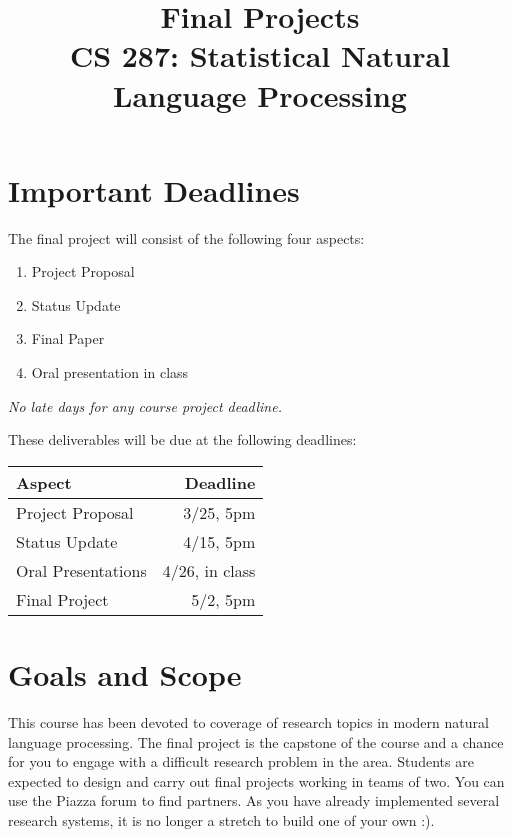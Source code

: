 \documentclass[11pt]{article}
\title{Final Projects  \\ CS 287: Statistical Natural Language Processing}
\date{}
\begin{document}
\maketitle{}

\section{Important Deadlines}

The final project will consist of the following four aspects:

\begin{enumerate}
\item Project Proposal
\item Status Update
\item Final Paper
\item Oral presentation in class
\end{enumerate}
\emph{No late days for any course project deadline.}

\vspace{0.25cm}

\noindent These deliverables will be due at the following deadlines:

\begin{center}
\begin{tabularx}{0.4\linewidth}{lr}
  \toprule
  Aspect & Deadline \\
  \midrule
  Project Proposal & 3/25, 5pm \\
  Status Update & 4/15, 5pm \\
  Oral Presentations&  4/26, in class \\
  Final Project &  5/2, 5pm \\
  \bottomrule
\end{tabularx}
\end{center}


\section{Goals and Scope}\label{goals-and-scope}

This course has been devoted to coverage of research
topics in modern natural language processing. The final 
project is the capstone of the course and a chance for you 
to engage with a difficult research problem in the area. 
Students are expected to design and carry out final
projects working in teams of two. You can use the Piazza forum
to find partners. 
As you have already implemented several research systems, 
it is no longer a stretch to build one of your own :).
\end{document}
